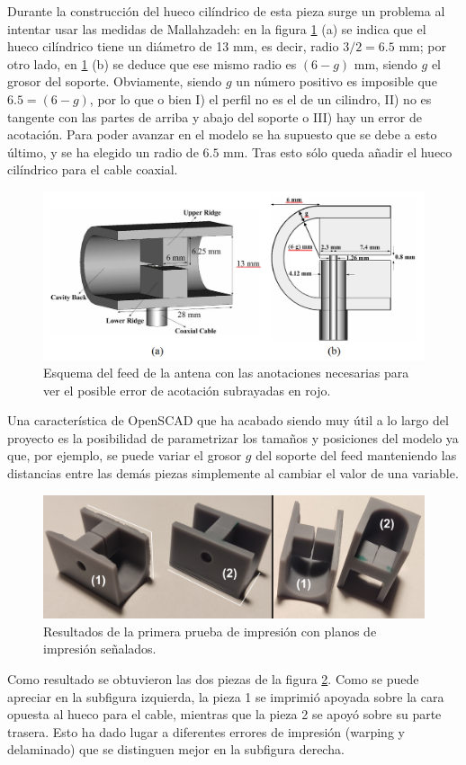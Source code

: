 \documentclass[11pt,a4paper,twoside,pdf]{article}
\numberwithin{equation}{section}
\begin{document}
Durante la construcción del hueco cilíndrico de esta pieza surge un problema al intentar usar las medidas de Mallahzadeh: en la figura \ref{fig:esquemaFeed} (a) se indica que el hueco cilíndrico tiene un diámetro de 13 mm, es decir, radio $3/2=6.5$ mm; por otro lado, en \ref{fig:esquemaFeed} (b) se deduce que ese mismo radio es $(6-g)$ mm, siendo $g$ el grosor del soporte. Obviamente, siendo $g$ un número positivo es imposible que $6.5 = (6-g)$, por lo que o bien I) el perfil no es el de un cilindro, II) no es tangente con las partes de arriba y abajo del soporte o III) hay un error de acotación. Para poder avanzar en el modelo se ha supuesto que se debe a esto último, y se ha elegido un radio de $6.5$ mm. Tras esto sólo queda añadir el hueco cilíndrico para el cable coaxial.
\begin{figure}[!h]
    \centering
    \includegraphics[width=0.9\linewidth]{img/modelos/SoporteFeed/feedEsquema.png}
    \caption{Esquema del feed de la antena \cite{tem_horn} con las anotaciones necesarias para ver el posible error de acotación subrayadas en rojo.}
    \label{fig:esquemaFeed}
\end{figure}

Una característica de OpenSCAD que ha acabado siendo muy útil a lo largo del proyecto es la posibilidad de parametrizar los tamaños y posiciones del modelo ya que, por ejemplo, se puede variar el grosor $g$ del soporte del feed manteniendo las distancias entre las demás piezas simplemente al cambiar el valor de una variable.

\begin{figure}[!h]
    \centering
    \includegraphics[width=0.8\linewidth]{img/fotos/feed.png}
    \vspace{-0.3cm}
    \caption{Resultados de la primera prueba de impresión con planos de impresión señalados.}
    \label{fig:print1}
\end{figure}
Como resultado se obtuvieron las dos piezas de la figura \ref{fig:print1}. Como se puede apreciar en la subfigura izquierda, la pieza 1 se imprimió apoyada sobre la cara opuesta al hueco para el cable, mientras que la pieza 2 se apoyó sobre su parte trasera. Esto ha dado lugar a diferentes errores de impresión (warping y delaminado) que se distinguen mejor en la subfigura derecha.
\end{document}
